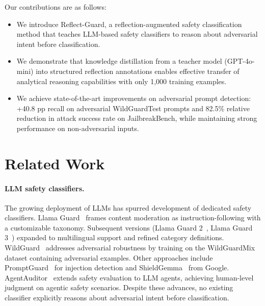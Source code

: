 \documentclass[ai,article,submit,pdftex,moreauthors]{Definitions/mdpi}
\begin{document}
Our contributions are as follows:
\begin{itemize}[leftmargin=*, nosep]
  \item We introduce Reflect-Guard, a reflection-augmented safety classification method that teaches LLM-based safety classifiers to reason about adversarial intent before classification.
  \item We demonstrate that knowledge distillation from a teacher model (GPT-4o-mini) into structured reflection annotations enables effective transfer of analytical reasoning capabilities with only 1{,}000 training examples.
  \item We achieve state-of-the-art improvements on adversarial prompt detection: +40.8 pp recall on adversarial WildGuardTest prompts and 82.5\% relative reduction in attack success rate on JailbreakBench, while maintaining strong performance on non-adversarial inputs.
\end{itemize}

\section{Related Work}

\paragraph{LLM safety classifiers.}
The growing deployment of LLMs has spurred development of dedicated safety classifiers. Llama Guard~\citep{inan2023llamaguard} frames content moderation as instruction-following with a customizable taxonomy. Subsequent versions (Llama Guard 2~\citep{metallamaguard2}, Llama Guard 3~\citep{metallamaguard3}) expanded to multilingual support and refined category definitions. WildGuard~\citep{han2024wildguard} addresses adversarial robustness by training on the WildGuardMix dataset containing adversarial examples. Other approaches include PromptGuard~\citep{meta2024promptguard} for injection detection and ShieldGemma~\citep{zeng2024shieldgemma} from Google. AgentAuditor~\citep{luo2025agentauditor} extends safety evaluation to LLM agents, achieving human-level judgment on agentic safety scenarios. Despite these advances, no existing classifier explicitly reasons about adversarial intent before classification.
\end{document}
